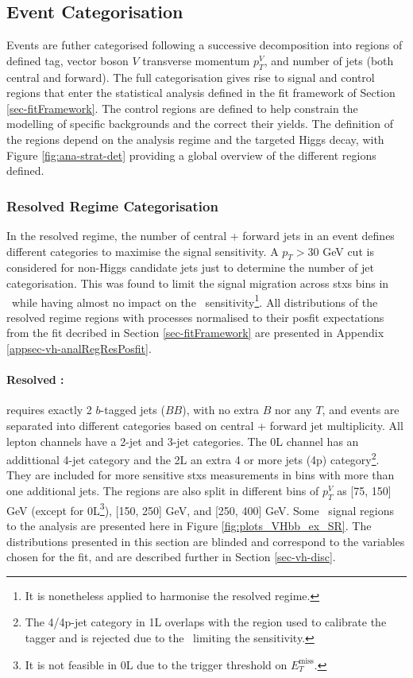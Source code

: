 \subsection{Event Categorisation}\label{sec-eventCat}
Events are futher categorised following a successive decomposition into regions of defined tag, vector boson $V$ transverse momentum $p_T^V$, and number of jets (both central and forward). The full categorisation gives rise to signal and control regions that enter the statistical analysis defined in the fit framework of Section \ref{sec-fitFramework}. The control regions are defined to help constrain the modelling of specific backgrounds and the correct their yields. The definition of the regions depend on the analysis regime and the targeted Higgs decay, with Figure \ref{fig:ana-strat-det} providing a global overview of the different regions defined.

\subsubsection{Resolved Regime Categorisation}
In the resolved regime, the number of central + forward jets in an event defines different categories to maximise the signal sensitivity. A $p_T > 30$ GeV cut is considered for non-Higgs candidate jets just to determine the number of jet categorisation. This was found to limit the signal migration across \gls{stxs} bins in \vhb\ while having almost no impact on the \vhc\ sensitivity\footnote{It is nonetheless applied to harmonise the resolved regime.}. All distributions of the resolved regime regions with processes normalised to their posfit expectations from the fit decribed in Section \ref{sec-fitFramework} are presented in Appendix \ref{appsec-vh-analRegResPosfit}.

\paragraph{Resolved \vhb:} requires exactly 2 $b$-tagged jets ($BB$), with no extra $B$ nor any $T$, and events are separated into different categories based on central + forward jet multiplicity. All lepton channels have a 2-jet and 3-jet categories. The 0L channel has an addittional 4-jet category and the 2L an extra 4 or more jets (4p) category\footnote{The 4/4p-jet category in 1L overlaps with the region used to calibrate the tagger and is rejected due to the \ttb\ limiting the sensitivity.}. They are included for more sensitive \gls{stxs} measurements in bins with more than one additional jets. The regions are also split in different bins of $p_T^V$ as [75, 150] GeV (except for 0L\footnote{It is not feasible in 0L due to the trigger threshold on $E_T^{\textrm{miss}}$.}), [150, 250] GeV, and [250, 400] GeV. Some \vhb\ signal regions to the analysis are presented here in Figure \ref{fig:plots_VHbb_ex_SR}. The distributions presented in this section are blinded and correspond to the variables chosen for the fit, and are described further in Section \ref{sec-vh-disc}.

